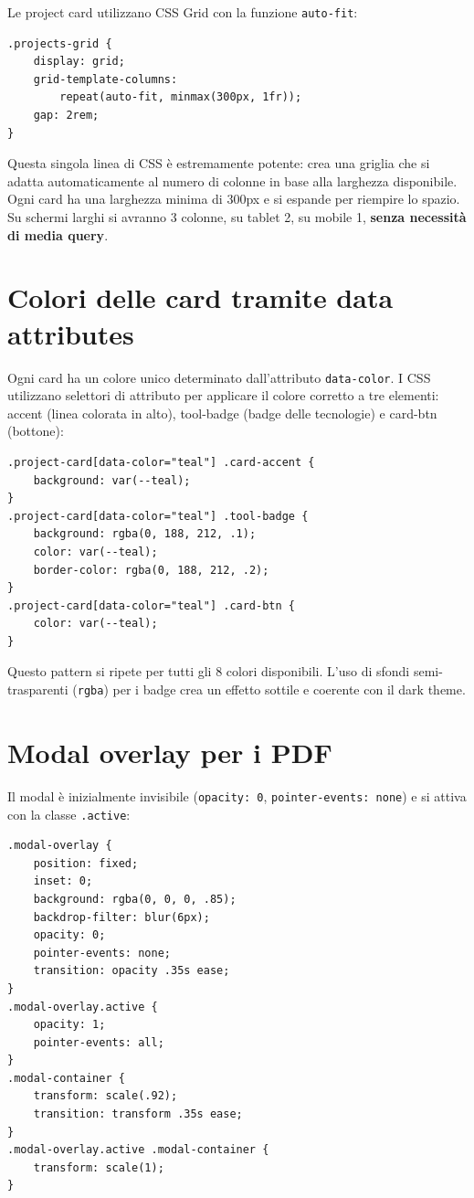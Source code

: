 \documentclass[a4paper,12pt]{report}
\begin{document}
Le project card utilizzano CSS Grid con la funzione \texttt{auto-fit}:

\begin{lstlisting}[style=cssstyle, caption={Grid responsiva per i progetti}]
.projects-grid {
    display: grid;
    grid-template-columns:
        repeat(auto-fit, minmax(300px, 1fr));
    gap: 2rem;
}
\end{lstlisting}

Questa singola linea di CSS \`e estremamente potente: crea una griglia che si adatta automaticamente al numero di colonne in base alla larghezza disponibile. Ogni card ha una larghezza minima di 300px e si espande per riempire lo spazio. Su schermi larghi si avranno 3 colonne, su tablet 2, su mobile 1, \textbf{senza necessit\`a di media query}.

\section{Colori delle card tramite data attributes}

Ogni card ha un colore unico determinato dall'attributo \texttt{data-color}. I CSS utilizzano selettori di attributo per applicare il colore corretto a tre elementi: accent (linea colorata in alto), tool-badge (badge delle tecnologie) e card-btn (bottone):

\begin{lstlisting}[style=cssstyle, caption={Esempio: stile per il colore teal}]
.project-card[data-color="teal"] .card-accent {
    background: var(--teal);
}
.project-card[data-color="teal"] .tool-badge {
    background: rgba(0, 188, 212, .1);
    color: var(--teal);
    border-color: rgba(0, 188, 212, .2);
}
.project-card[data-color="teal"] .card-btn {
    color: var(--teal);
}
\end{lstlisting}

Questo pattern si ripete per tutti gli 8 colori disponibili. L'uso di sfondi semi-trasparenti (\texttt{rgba}) per i badge crea un effetto sottile e coerente con il dark theme.

\section{Modal overlay per i PDF}

Il modal \`e inizialmente invisibile (\texttt{opacity: 0}, \texttt{pointer-events: none}) e si attiva con la classe \texttt{.active}:

\begin{lstlisting}[style=cssstyle, caption={Animazione del modal}]
.modal-overlay {
    position: fixed;
    inset: 0;
    background: rgba(0, 0, 0, .85);
    backdrop-filter: blur(6px);
    opacity: 0;
    pointer-events: none;
    transition: opacity .35s ease;
}
.modal-overlay.active {
    opacity: 1;
    pointer-events: all;
}
.modal-container {
    transform: scale(.92);
    transition: transform .35s ease;
}
.modal-overlay.active .modal-container {
    transform: scale(1);
}
\end{lstlisting}
\end{document}
